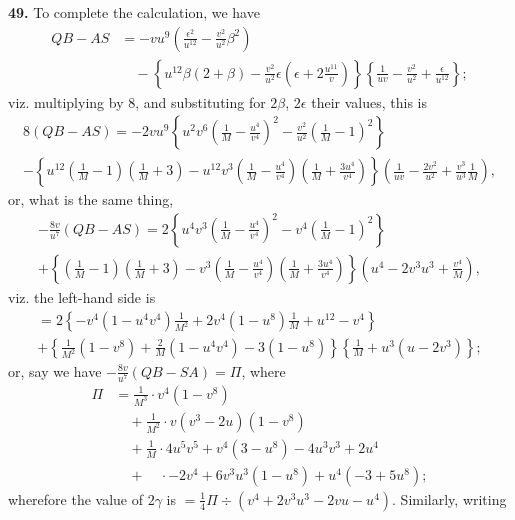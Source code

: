 \documentclass[11pt,a4paper]{book}
\begin{document}
\textbf{49.} To complete the calculation, we have
\begin{align*}
QB - AS &= -vu^9\left(\frac{\epsilon^2}{u^{12}} - \frac{v^2}{u^2}\beta^2\right) \\
&\quad - \left\{u^{12}\beta(2 + \beta) - \frac{v^2}{u^2}\epsilon\left(\epsilon + 2\frac{u^{11}}{v}\right)\right\}
\left\{\frac{1}{uv} - \frac{v^2}{u^2} + \frac{\epsilon}{u^{12}}\right\};
\end{align*}
viz. multiplying by 8, and substituting for $2\beta$, $2\epsilon$ their values, this is
\begin{multline*}
8(QB - AS) = -2vu^9\left\{u^2 v^6\left(\frac{1}{M} - \frac{u^4}{v^4}\right)^2 - \frac{v^2}{u^2}\left(\frac{1}{M} - 1\right)^2\right\} \\
- \left\{u^{12}\left(\frac{1}{M} - 1\right)\left(\frac{1}{M} + 3\right)
- u^{12} v^3\left(\frac{1}{M} - \frac{u^4}{v^4}\right)\left(\frac{1}{M} + \frac{3u^4}{v^4}\right)\right\}
\left(\frac{1}{uv} - \frac{2v^2}{u^2} + \frac{v^3}{u^3}\frac{1}{M}\right),
\end{multline*}
or, what is the same thing,
\begin{multline*}
-\frac{8v}{u^7}(QB - AS) = 2\left\{u^4 v^3\left(\frac{1}{M} - \frac{u^4}{v^4}\right)^2 - v^4\left(\frac{1}{M} - 1\right)^2\right\} \\
+ \left\{\left(\frac{1}{M} - 1\right)\left(\frac{1}{M} + 3\right)
- v^3\left(\frac{1}{M} - \frac{u^4}{v^4}\right)\left(\frac{1}{M} + \frac{3u^4}{v^4}\right)\right\}
\left(u^4 - 2v^3 u^3 + \frac{v^4}{M}\right),
\end{multline*}
viz. the left-hand side is
\begin{multline*}
= 2\left\{-v^4(1 - u^4 v^4)\frac{1}{M^2} + 2v^4(1 - u^8)\frac{1}{M} + u^{12} - v^4\right\} \\
+ \left\{\frac{1}{M^2}(1 - v^8) + \frac{2}{M}(1 - u^4 v^4) - 3(1 - u^8)\right\}
\left\{\frac{1}{M} + u^3(u - 2v^3)\right\};
\end{multline*}
or, say we have $-\frac{8v}{u^7}(QB - SA) = \Pi$, where
\begin{align*}
\Pi &= \frac{1}{M^3} \cdot v^4(1 - v^8) \\
&\quad + \frac{1}{M^2} \cdot v(v^3 - 2u)(1 - v^8) \\
&\quad + \frac{1}{M} \cdot 4u^5 v^5 + v^4(3 - u^8) - 4u^3 v^3 + 2u^4 \\
&\quad + \quad \cdot -2v^4 + 6v^3 u^3(1 - u^8) + u^4(-3 + 5u^8);
\end{align*}
wherefore the value of $2\gamma$ is $= \frac{1}{4}\Pi \div (v^4 + 2v^3 u^3 - 2vu - u^4)$. Similarly, writing
\end{document}
